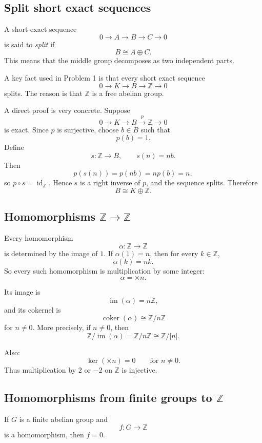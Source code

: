 \documentclass[12pt,a4paper]{article}
\theoremstyle{notespace}
\begin{document}
\subsection{Split short exact sequences}

A short exact sequence
\[
0\longrightarrow A\longrightarrow B\longrightarrow C\longrightarrow 0
\]
is said to \emph{split} if
\[
B\cong A\oplus C.
\]
This means that the middle group decomposes as two independent parts.

A key fact used in Problem 1 is that every short exact sequence
\[
0\longrightarrow K\longrightarrow B\longrightarrow \mathbb Z\longrightarrow 0
\]
splits. The reason is that \(\mathbb Z\) is a free abelian group.

A direct proof is very concrete. Suppose
\[
0\longrightarrow K\longrightarrow B\xrightarrow{p}\mathbb Z\longrightarrow 0
\]
is exact. Since \(p\) is surjective, choose \(b\in B\) such that
\[
p(b)=1.
\]
Define
\[
s:\mathbb Z\longrightarrow B,
\qquad
s(n)=nb.
\]
Then
\[
p(s(n))=p(nb)=np(b)=n,
\]
so \(p\circ s=\operatorname{id}_{\mathbb Z}\). Hence \(s\) is a right inverse of \(p\), and the sequence splits. Therefore
\[
B\cong K\oplus \mathbb Z.
\]

\subsection{Homomorphisms \(\mathbb Z\to \mathbb Z\)}

Every homomorphism
\[
\alpha:\mathbb Z\to\mathbb Z
\]
is determined by the image of \(1\). If \(\alpha(1)=n\), then for every \(k\in \mathbb Z\),
\[
\alpha(k)=nk.
\]
So every such homomorphism is multiplication by some integer:
\[
\alpha=\times n.
\]

Its image is
\[
\operatorname{im}(\alpha)=n\mathbb Z,
\]
and its cokernel is
\[
\operatorname{coker}(\alpha)\cong \mathbb Z/n\mathbb Z
\]
for \(n\neq 0\). More precisely, if \(n\neq 0\), then
\[
\mathbb Z/\operatorname{im}(\alpha)=\mathbb Z/n\mathbb Z\cong \mathbb Z/|n|.
\]

Also:
\[
\ker(\times n)=0
\qquad
\text{for } n\neq 0.
\]
Thus multiplication by \(2\) or \(-2\) on \(\mathbb Z\) is injective.

\subsection{Homomorphisms from finite groups to \(\mathbb Z\)}

If \(G\) is a finite abelian group and
\[
f:G\to \mathbb Z
\]
is a homomorphism, then \(f=0\).
\end{document}
